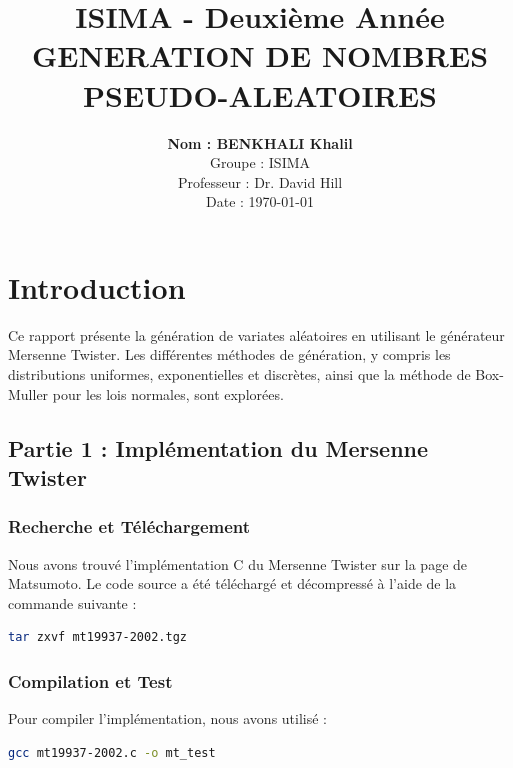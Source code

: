 \documentclass[a4paper,12pt]{report}
\title{
    \textbf{ISIMA - Deuxième Année}\\
    \vspace{1cm}
    \Huge GENERATION DE NOMBRES PSEUDO-ALEATOIRES
}
\author{
    \textbf{Nom : BENKHALI Khalil}\\
    Groupe : ISIMA \\
    Professeur : Dr. David Hill \\
    Date : \today
}
\date{}
\begin{document}
\maketitle %

\newpage

\tableofcontents

\newpage

\chapter*{Introduction} %
Ce rapport présente la génération de variates aléatoires en utilisant le générateur Mersenne Twister. Les différentes méthodes de génération, y compris les distributions uniformes, exponentielles et discrètes, ainsi que la méthode de Box-Muller pour les lois normales, sont explorées.

\newpage
\section*{Partie 1 : Implémentation du Mersenne Twister}

\subsection*{Recherche et Téléchargement}
Nous avons trouvé l'implémentation C du Mersenne Twister sur la page de Matsumoto. Le code source a été téléchargé et décompressé à l'aide de la commande suivante :

\begin{lstlisting}[language=bash]
tar zxvf mt19937-2002.tgz
\end{lstlisting}

\subsection*{Compilation et Test}
Pour compiler l'implémentation, nous avons utilisé :

\begin{lstlisting}[language=bash]
gcc mt19937-2002.c -o mt_test
\end{lstlisting}
\end{document}
